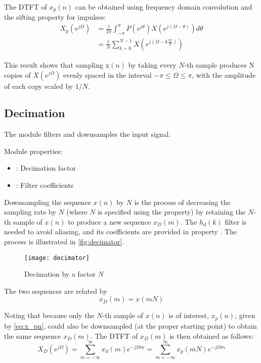 The DTFT of $x_p(n)$ can be obtained using frequency domain convolution and the sifting property for impulses:
\begin{align}
  X_p\left(e^{j\Omega}\right) &= \frac{1}{2\pi}\int_{-\pi}^{\pi}P\left(e^{j\theta}\right)X\left(e^{j\left(\Omega-\theta\right)}\right)d\theta \nonumber\\
                              &= \frac{1}{N}\sum_{k=0}^{N-1}X\left(e^{j\left(\Omega-k\frac{2\pi}{N}\right)}\right) \label{eq:X_p}
\end{align}

This result shows that sampling x$(n)$ by taking every $N$-th sample produces N copies of $X\left(e^{j\Omega}\right)$ evenly spaced in the interval $-\pi\leq\Omega\leq\pi$, with the amplitude of each copy scaled by $1/N$.

\subsection{Decimation}

The  module filters and downsamples the input signal.

\noindent Module properties:
\begin{itemize}
  \item {}: Decimation factor
  \item {}: Filter coefficients
\end{itemize}

Downsampling the sequence $x(n)$ by $N$ is the process of decreasing the sampling rate by $N$ (where $N$ is specified using the  property) by retaining the $N$-th sample of $x(n)$ to produce a new sequence $x_D(m)$. The $h_d(k)$ filter is needed to avoid aliasing, and its coefficients are provided in property . The process is illustrated in \autoref{fig:decimator}.

\begin{figure}[ht]
  \centering
  \texttt{[image: decimator]}
  \caption{Decimation by a factor $N$}
  \label{fig:decimator}
\end{figure}

The two sequences are related by
\begin{equation}
  x_D(m)=x(mN)
\end{equation}

Noting that because only the $N$-th sample of $x(n)$ is of interest, $x_p(n)$, given by \eqref{eq:x_pn}, could also be downsampled (at the proper starting point) to obtain the same sequence $x_D(m)$. The DTFT of $x_D(m)$ is then obtained as follows:
\begin{equation}
  X_D(e^{j\Omega}) = \sum_{m=-\infty}^{\infty} x_d(m)e^{-j\Omega m} = \sum_{m=-\infty}^{\infty} x_p(mN)e^{-j\Omega m}
\end{equation}

